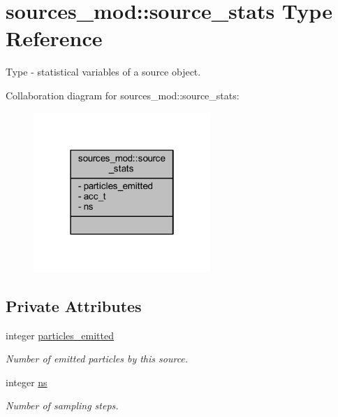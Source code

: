 \hypertarget{structsources__mod_1_1source__stats}{}\section{sources\+\_\+mod\+:\+:source\+\_\+stats Type Reference}
\label{structsources__mod_1_1source__stats}


Type -\/ statistical variables of a source object.  




Collaboration diagram for sources\+\_\+mod\+:\+:source\+\_\+stats\+:\nopagebreak
\begin{figure}[H]
\begin{center}
\leavevmode
\includegraphics[width=190pt]{structsources__mod_1_1source__stats__coll__graph}
\end{center}
\end{figure}
\subsection*{Private Attributes}
\begin{DoxyCompactItemize}
\item 
integer \mbox{\hyperlink{structsources__mod_1_1source__stats_a2253ced036ad1a9fee933b6b08135189}{particles\+\_\+emitted}}
\begin{DoxyCompactList}\small\item\em Number of emitted particles by this source. \end{DoxyCompactList}\item 
integer \mbox{\hyperlink{structsources__mod_1_1source__stats_a77ba33fcefa55c8d8e440844ee7f4640}{ns}}
\begin{DoxyCompactList}\small\item\em Number of sampling steps. \end{DoxyCompactList}\end{DoxyCompactItemize}



